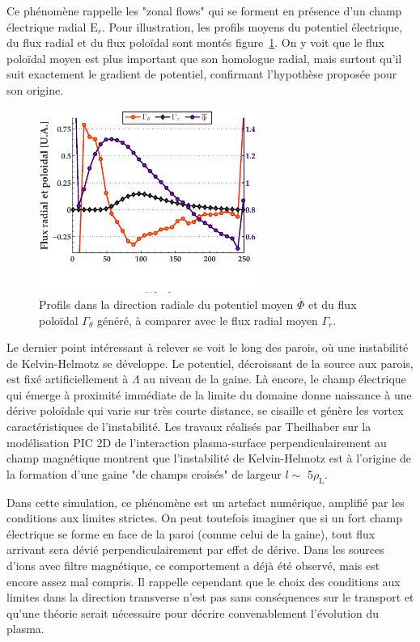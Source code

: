 \begin{refsection}
Ce phénomène rappelle les "zonal flows" qui se forment en présence
d'un champ électrique radial $\text{E}_r$. Pour illustration, les profils moyens du
potentiel électrique, du flux radial et du flux poloïdal sont montés
figure~\ref{2-profileFluxRadialWhTedNdx}. On y voit que le flux poloïdal moyen
est plus important que son homologue radial, mais surtout qu'il suit exactement
le gradient de potentiel, confirmant l'hypothèse proposée pour son origine.

	\begin{figure}[!htbp]
    \centering
    \includegraphics[height=6cm]{figures/2-profileFluxWhTedNdx.eps}
    \caption{Profils dans la direction radiale du potentiel moyen
    $\overline{\Phi}$ et du flux poloïdal $\Gamma_\theta$ généré, à comparer
    avec le flux radial moyen $\Gamma_r$.\label{2-profileFluxRadialWhTedNdx}}
	\end{figure}

Le dernier point intéressant à relever se voit le long des parois, où une
instabilité de Kelvin-Helmotz se développe. Le potentiel, décroissant de la
source aux parois, est fixé artificiellement à $\Lambda$ au niveau de la gaine.
Là encore, le champ électrique qui émerge à proximité immédiate de la limite du
domaine donne naissance à une dérive poloïdale qui varie sur très courte
distance, se cisaille et génère les vortex caractéristiques de l'instabilité.
Les travaux réalisés par Theilhaber sur la modélisation PIC 2D de l'interaction
plasma-surface perpendiculairement au champ magnétique
\parencite{Theilhaber} montrent que l'instabilité de Kelvin-Helmotz est à
l'origine de la formation d'une gaine "de champs croisés" de largeur $l\sim$
5$\rho_\text{L}$.

Dans cette simulation, ce phénomène est un artefact numérique, amplifié par les
conditions aux limites strictes. On peut toutefois imaginer que si un fort
champ électrique se forme en face de la paroi (comme celui de la gaine), tout
flux arrivant sera dévié perpendiculairement par effet de dérive.
Dans les sources d'ions avec filtre magnétique, ce comportement a déjà été
observé, mais est encore assez mal compris. Il rappelle cependant que le choix
des conditions aux limites dans la direction transverse n'est pas sans
conséquences sur le transport et qu'une théorie serait nécessaire pour décrire
convenablement l'évolution du plasma.


\end{refsection}
